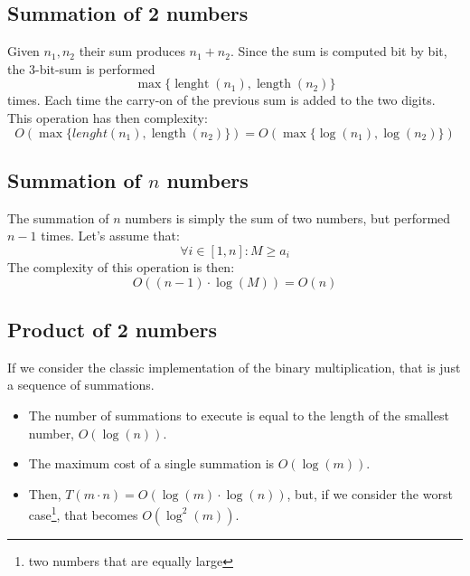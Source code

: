 \subsection{Summation of 2 numbers}
Given $n_{1}, n_{2}$ their sum produces $n_{1} + n_{2}$. \newline
Since the sum is computed bit by bit, the 3-bit-sum is performed \[\operatorname{max}\{\operatorname{lenght}(n_{1}), \operatorname{length}(n_{2})\}\] times.\newline
Each time the carry-on of the previous sum is added to the two digits. \newline
This operation has then complexity:
\[O(\operatorname{max}\{lenght(n_{1}), \operatorname{length}(n_{2})\}) = O(\operatorname{max}\{\operatorname{log}(n_{1}), \operatorname{log}(n_{2})\})\]

\subsection{Summation of $n$ numbers}
The summation of $n$ numbers is simply the sum of two numbers, but performed $n - 1$ times. \newline
Let's assume that: \[\forall i \in [1,n]: M \geq a_{i}\]
The complexity of this operation is then: \[O((n-1) \cdot \operatorname{log}(M)) = O(n)\] \newline

\subsection{Product of 2 numbers}
If we consider the classic implementation of the binary multiplication, that is just a sequence of summations. \newline
\begin{itemize}
    \item The number of summations to execute is equal to the length of the smallest number, $O(\operatorname{log}(n))$.
    \item The maximum cost of a single summation is $O(\operatorname{log}(m))$.
    \item Then, $T(m \cdot n) = O(\operatorname{log}(m) \cdot \operatorname{log}(n))$, but, if we consider the worst case\footnote{two numbers that are equally large}, that becomes $O(\operatorname{log}^{2}(m))$.
\end{itemize}

